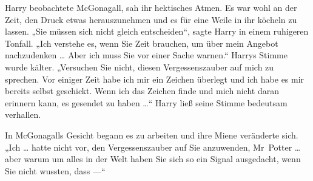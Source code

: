 Harry beobachtete McGonagall, sah ihr hektisches Atmen. Es war wohl an der Zeit, den Druck etwas herauszunehmen und es für eine Weile in ihr köcheln zu lassen.
„Sie müssen sich nicht gleich entscheiden“, sagte Harry in einem ruhigeren Tonfall.
„Ich verstehe es, wenn Sie Zeit brauchen, um über mein Angebot nachzudenken … Aber ich muss Sie vor einer Sache warnen.“ Harrys Stimme wurde kälter.
„Versuchen Sie nicht, diesen Vergessenszauber auf mich zu sprechen. Vor einiger Zeit habe ich mir ein Zeichen überlegt und ich habe es mir bereits selbst geschickt. Wenn ich das Zeichen finde und mich nicht daran erinnern kann, es gesendet zu haben …“ Harry ließ seine Stimme bedeutsam verhallen.

In McGonagalls Gesicht begann es zu arbeiten und ihre Miene veränderte sich.
„Ich … hatte nicht vor, den Vergessenszauber auf Sie anzuwenden, Mr~Potter … aber warum um alles in der Welt haben Sie sich so ein Signal ausgedacht, wenn Sie nicht wussten, dass —“


